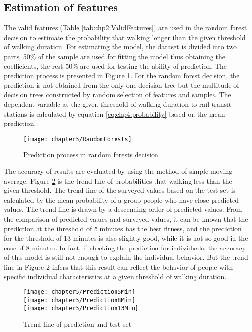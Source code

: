 %
\subsection{Estimation of features}
The valid features (Table \ref{tab:chp2:ValidFeatures}) are used in the random forest decision to estimate the probability that walking longer than the given threshold of walking duration. For estimating the model, the dataset is divided into two parts, 50\% of the sample are used for fitting the model thus obtaining the coefficients, the rest 50\% are used for testing the ability of prediction. The prediction process is presented in Figure \ref{fig:chp2:RandomForests}. For the random forest decision, the prediction is not obtained from the only one decision tree but the multitude of decision trees constructed by random selection of features and samples. The dependent variable at the given threshold of walking duration to rail transit stations is calculated by equation \ref{eq:chp4:probability} based on the mean prediction.

\begin{figure}[htbp]
	\centering
	\texttt{[image: chapter5/RandomForests]}
	\caption{Prediction process in random forests decision}
	\label{fig:chp2:RandomForests}
\end{figure}

%
The accuracy of results are evaluated by using the method of simple moving average. Figure \ref{fig:chp2:Prediction} is the trend line of probabilities that walking less than the given threshold. The trend line of the surveyed values based on the test set is calculated by the mean probability of a group people who have close predicted values. The trend line is drawn by a descending order of predicted values. From the comparison of predicted values and surveyed values, it can be known that the prediction at the threshold of 5 minutes has the best fitness, and the prediction for the threshold of 13 minutes is also slightly good, while it is not so good in the case of 8 minutes. In fact, if checking the prediction for individuals, the accuracy of this model is still not enough to explain the individual behavior. But the trend line in Figure \ref{fig:chp2:Prediction} infers that this result can reflect the behavior of people with specific individual characteristics at a given threshold of walking duration. 

\begin{figure}[htbp]
	\centering
	\texttt{[image: chapter5/Prediction5Min]} \\
	\texttt{[image: chapter5/Prediction8Min]} \\
	\texttt{[image: chapter5/Prediction13Min]} \\
	\caption{Trend line of prediction and test set}
	\label{fig:chp2:Prediction}
\end{figure}

